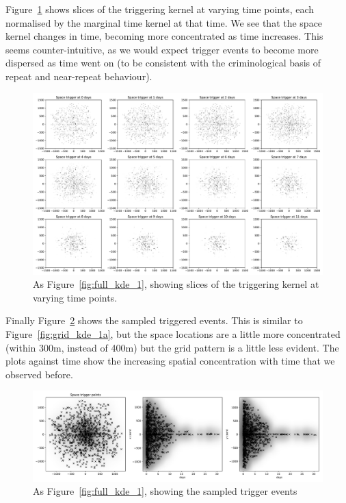 \documentclass[twoside,a4paper]{article}
\theoremstyle{plain}
\theoremstyle{definition}
\begin{document}
Figure~\ref{fig:full_kde_2} shows slices of the triggering kernel at varying time points,
each normalised by the marginal time kernel at that time.  We see that the space kernel changes
in time, becoming more concentrated as time increases.  This seems counter-intuitive, as we would
expect trigger events to become more dispersed as time went on (to be consistent with the
criminological basis of repeat and near-repeat behaviour).

\begin{figure}
  \includegraphics[width=\textwidth]{../notebooks/full_kde_2.pdf}
  \caption{As Figure~\ref{fig:full_kde_1}, showing slices of the triggering kernel at varying time points.}
  \label{fig:full_kde_2}
\end{figure}

Finally Figure~\ref{fig:full_kde_3} shows the sampled triggered events.  This is similar to
Figure~\ref{fig:grid_kde_1a}, but the space locations are a little more concentrated (within 300m,
instead of 400m) but the grid pattern is a little less evident.  The plots against time show the
increasing spatial concentration with time that we observed before.

\begin{figure}
  \includegraphics[width=\textwidth]{../notebooks/full_kde_3.pdf}
  \caption{As Figure~\ref{fig:full_kde_1}, showing the sampled trigger events}
  \label{fig:full_kde_3}
\end{figure}
\end{document}
